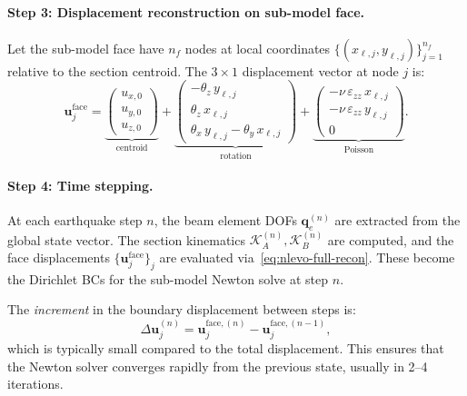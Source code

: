 \paragraph{Step 3: Displacement reconstruction on sub-model face.}
Let the sub-model face have $n_f$ nodes at local coordinates
$\{(x_{\ell,j}, y_{\ell,j})\}_{j=1}^{n_f}$ relative to the section
centroid.  The $3 \times 1$ displacement vector at node $j$ is:
\begin{equation}
  \mathbf{u}_j^{\mathrm{face}}
  = \underbrace{
    \begin{pmatrix} u_{x,0} \\ u_{y,0} \\ u_{z,0} \end{pmatrix}
    }_{\text{centroid}}
  + \underbrace{
    \begin{pmatrix}
      -\theta_z\,y_{\ell,j} \\
       \theta_z\,x_{\ell,j} \\
       \theta_x\,y_{\ell,j} - \theta_y\,x_{\ell,j}
    \end{pmatrix}
    }_{\text{rotation}}
  + \underbrace{
    \begin{pmatrix}
      -\nu\,\varepsilon_{zz}\,x_{\ell,j} \\
      -\nu\,\varepsilon_{zz}\,y_{\ell,j} \\
      0
    \end{pmatrix}
    }_{\text{Poisson}}.
  \label{eq:nlevo-full-recon}
\end{equation}

\paragraph{Step 4: Time stepping.}
At each earthquake step $n$, the beam element DOFs
$\mathbf{q}_e^{(n)}$ are extracted from the global state vector.
The section kinematics $\mathcal{K}_A^{(n)}, \mathcal{K}_B^{(n)}$ are
computed, and the face displacements
$\{\mathbf{u}_j^{\mathrm{face}}\}_j$ are evaluated
via~\eqref{eq:nlevo-full-recon}.  These become the Dirichlet BCs for
the sub-model Newton solve at step $n$.

The \emph{increment} in the boundary displacement between steps
is:
\begin{equation}
  \Delta\mathbf{u}_j^{(n)}
  = \mathbf{u}_j^{\mathrm{face},(n)}
  - \mathbf{u}_j^{\mathrm{face},(n-1)},
  \label{eq:nlevo-delta-bc}
\end{equation}
which is typically small compared to the total displacement.  This
ensures that the Newton solver converges rapidly from the previous
state, usually in 2--4 iterations.

